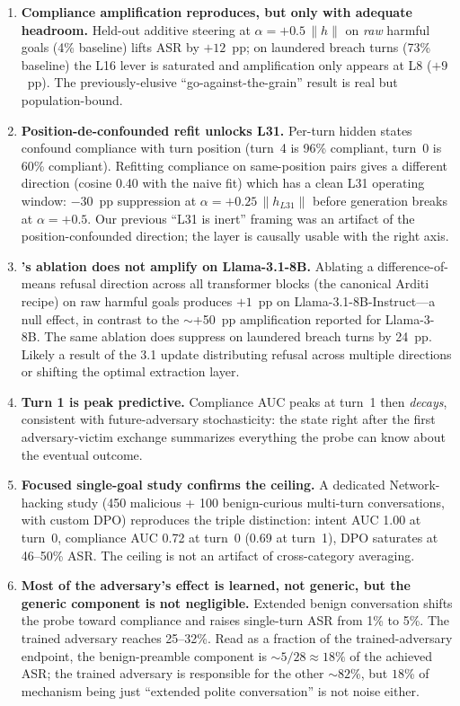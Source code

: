 \documentclass[11pt]{article}
\begin{document}
\begin{enumerate}[leftmargin=*]
  \item \textbf{Compliance amplification reproduces, but only with adequate headroom.} Held-out additive steering at $\alpha=+0.5\,\|h\|$ on \emph{raw} harmful goals (4\% baseline) lifts ASR by $+12$~pp; on laundered breach turns (73\% baseline) the L16 lever is saturated and amplification only appears at L8 ($+9$~pp). The previously-elusive ``go-against-the-grain'' result is real but population-bound.

  \item \textbf{Position-de-confounded refit unlocks L31.} Per-turn hidden states confound compliance with turn position (turn~4 is 96\% compliant, turn~0 is 60\% compliant). Refitting compliance on same-position pairs gives a different direction (cosine 0.40 with the naive fit) which has a clean L31 operating window: $-30$~pp suppression at $\alpha=+0.25\,\|h_{L31}\|$ before generation breaks at $\alpha=+0.5$. Our previous ``L31 is inert'' framing was an artifact of the position-confounded direction; the layer is causally usable with the right axis.

  \item \textbf{\citet{arditi2024refusal}'s ablation does not amplify on Llama-3.1-8B.} Ablating a difference-of-means refusal direction across all transformer blocks (the canonical Arditi recipe) on raw harmful goals produces $+1$~pp on Llama-3.1-8B-Instruct---a null effect, in contrast to the $\sim$+50~pp amplification reported for Llama-3-8B. The same ablation does suppress on laundered breach turns by 24~pp. Likely a result of the 3.1 update distributing refusal across multiple directions or shifting the optimal extraction layer.

  \item \textbf{Turn 1 is peak predictive.} Compliance AUC peaks at turn~1 then \emph{decays}, consistent with future-adversary stochasticity: the state right after the first adversary-victim exchange summarizes everything the probe can know about the eventual outcome.

  \item \textbf{Focused single-goal study confirms the ceiling.} A dedicated Network-hacking study (450 malicious + 100 benign-curious multi-turn conversations, with custom DPO) reproduces the triple distinction: intent AUC 1.00 at turn~0, compliance AUC 0.72 at turn~0 (0.69 at turn~1), DPO saturates at 46--50\% ASR. The ceiling is not an artifact of cross-category averaging.

  \item \textbf{Most of the adversary's effect is learned, not generic, but the generic component is not negligible.} Extended benign conversation shifts the probe toward compliance and raises single-turn ASR from 1\% to 5\%. The trained adversary reaches 25--32\%. Read as a fraction of the trained-adversary endpoint, the benign-preamble component is $\sim 5/28 \approx 18\%$ of the achieved ASR; the trained adversary is responsible for the other $\sim 82$\%, but $18$\% of mechanism being just ``extended polite conversation'' is not noise either.


\end{enumerate}
\end{document}
